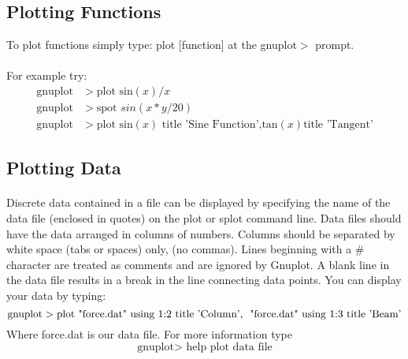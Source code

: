 \documentclass[12pt]{article}
\begin{document}
\subsection{Plotting Functions}
To plot functions simply type: plot [function] at the gnuplot$>$ prompt.
\paragraph{}
For example try:
\begin{align*}
\text{gnuplot}&>\text{plot } \text{sin}(x)/x\\
\text{gnuplot}&> \text{spot } sin(x*y/20)\\
\text{gnuplot}&> \text{plot sin}(x) \text{ title 'Sine Function',tan}(x) \text{title 'Tangent'}
\end{align*}
\subsection{Plotting Data}
\paragraph{}
Discrete data contained in a file can be displayed by specifying the name of the data file (enclosed in quotes) on the plot or splot command line. Data files should have the data arranged in columns of numbers. Columns should be separated by white space (tabs or spaces) only, (no commas). Lines beginning with a \# character are treated as comments and are ignored by Gnuplot. A blank line in the data file results in a break in the line connecting data points.
You can display your data by typing:
$$\text{gnuplot}>\text{plot  "force.dat" using 1:2 title 'Column', \
                      "force.dat" using 1:3 title 'Beam'}$$
Where force.dat is our data file.
For more information type
$$\text{gnuplot}>\text{ help plot data file}$$
\end{document}
